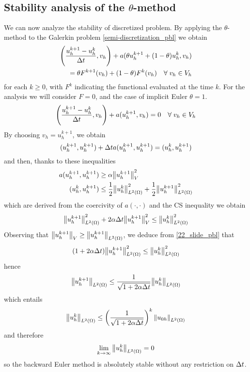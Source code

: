 \subsection{Stability analysis of the \texorpdfstring{\(\theta\)}{theta}-method}
We can now analyze the stability of discretized problem. 
By applying the \(\theta\)-method to the Galerkin problem \eqref{semi-discretization_pbl} we obtain 
\begin{equation}
    \begin{split}
        \left( \frac{u_h^{k+1}-u_h^k}{\Delta t}, v_h \right) + a(\theta u_h^{k+1} + (1-\theta) u^k_h, v_h) \\
        = \theta F^{k+1}(v_h) + (1-\theta) F^k(v_h) \quad \forall \; v_h \in V_h
    \end{split}
    \label{theta_method_stab_pbl}
\end{equation}
for each \(k \geq 0\), with \(F^k\) indicating the functional evaluated at the time \(k\).
For the analysis we will consider \(F=0\), and the case of implicit Euler \(\theta = 1\).
\[
    \left( \frac{u_h^{k+1}-u^k_h}{\Delta t}, v_h \right) + a(u^{k+1}_h, v_h) = 0 \quad \forall \; v_h \in V_h
\]
By choosing \(v_h = u_h^{k+1}\), we obtain 
\[
    ( u_h^{k+1}, u_h^{k+1} ) +\Delta t a(u^{k+1}_h, u_h^{k+1}) = (u_h^{k}, u_h^{k+1})
\]
and then, thanks to these inequalities 
\begin{align*}
    a(u_h^{k+1}, u_h^{k+1}) &\geq \alpha \norm{u_h^{k+1}}_V^2 \\
    (u_h^{k},u_h^{k+1}) &\leq \frac{1}{2} \norm{u_h^{k}}_{L^2(\Omega)}^2 + \frac{1}{2} \norm{u_h^{k+1}}_{L^2(\Omega)}^2
\end{align*}
which are derived from the coercivity of \(a(\cdot, \cdot)\) and the CS inequality we obtain 
\begin{equation}
    \norm{u_h^{k+1}}_{L^2(\Omega)}^2 +2\alpha \Delta t \norm{u_h^{k+1}}_V^2 \leq \norm{u_h^{k}}_{L^2(\Omega)}^2
    \label{22_slide_pbl}
\end{equation}
Observing that \(\norm{u_h^{k+1}}_V \geq \norm{u_h^{k+1}}_{L^2(\Omega)}\), we deduce from \eqref{22_slide_pbl} that 
\[
    (1+2\alpha \Delta t)\norm{u_h^{k+1}}_{L^2(\Omega)}^2 \leq \norm{u_h^{k}}_{L^2(\Omega)}^2
\]
hence 
\[
    \norm{u_h^{k+1}}_{L^2(\Omega)} \leq \frac{1}{\sqrt{1+2\alpha \Delta t}} \norm{u_h^{k}}_{L^2(\Omega)}
\]
which entails 
\[
    \norm{u_h^{k}}_{L^2(\Omega)} \leq \left( \frac{1}{\sqrt{1+2\alpha \Delta t}} \right)^k\norm{u_{0h}}_{L^2(\Omega)}
\]
and therefore 
\[
    \lim_{k\to \infty} \norm{u_h^{k}}_{L^2(\Omega)} = 0
\]
so the backward Euler method is absolutely stable without any restriction on \(\Delta t\).

